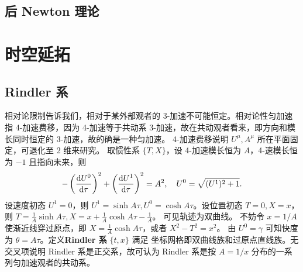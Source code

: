 \subsection{后 Newton 理论}


\section{时空延拓}

\subsection{Rindler 系}

相对论限制告诉我们，相对于某外部观者的 3-加速不可能恒定。相对论性匀加速指 4-加速费移，因为 4-加速等于共动系 3-加速，故在共动观者看来，即方向和模长同时恒定的 3-加速，故的确是一种匀加速。
4-加速费移说明 $U^\mu,A^\mu$ 所在平面固定，可退化至 2 维来研究。
取惯性系 $\{T,X\}$，设 4-加速模长恒为 $A$，4-速模长恒为 $-1$ 且指向未来，则
\[-\left(\dv{U^0}{\tau}\right)^2+\left(\dv{U^1}{\tau}\right)^2=A^2,\quad U^0=\sqrt{(U^1)^2+1}.\]
设速度初态 $U^1=0$，则 $U^1=\sinh A\tau,U^0=\cosh A\tau$。设位置初态 $T=0,X=x$，则 $T=\frac 1A\sinh A\tau,X=x+\frac 1A\cosh A\tau-\frac 1A$。
可见轨迹为双曲线。
不妨令 $x=1/A$ 使渐近线穿过原点，即 $X=\frac 1A\cosh A\tau$，或者 $X^2-T^2=x^2$。
由 $U^0=\gamma$ 可知快度为 $\theta=A\tau$。定义\textbf{Rindler 系} $\{t,x\}$ 满足
坐标网格即双曲线族和过原点直线族。无交叉项说明 Rindler 系是正交系，故可认为 Rindler 系是按 $A=1/x$ 分布的一系列匀加速观者的共动系。

